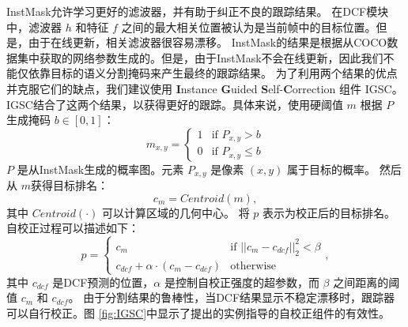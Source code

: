 InstMask允许学习更好的滤波器，并有助于纠正不良的跟踪结果。
在DCF模块中，滤波器 $h$ 和特征 $f$ 之间的最大相关位置被认为是当前帧中的目标位置。但是，由于在线更新，相关滤波器很容易漂移。
InstMask的结果是根据从COCO数据集中获取的网络参数生成的。但是，由于InstMask不会在线更新，因此我们不能仅依靠目标的语义分割掩码来产生最终的跟踪结果。
为了利用两个结果的优点并克服它们的缺点，我们建议使用 \textbf{I}nstance \textbf{G}uided \textbf{S}elf-\textbf{C}orrection 组件 IGSC。IGSC结合了这两个结果，以获得更好的跟踪。具体来说，使用硬阈值 $m$ 根据 $P$ 生成掩码 $b \in [0, 1] $：
\begin{equation}
m_{x,y} = \left\{ \begin{array}{ll}
 1 & \textrm{if $P_{x,y} > b$}\\
 0 & \textrm{if $P_{x,y} \le b$}
 \end{array} \right.
\end{equation}
$P$ 是从InstMask生成的概率图。元素 $P_{x,y}$ 是像素 $(x,y)$ 属于目标的概率。
然后从 $m$获得目标排名：
\begin{equation}
c_{m} = Centroid(m),
\end{equation}
其中 $Centroid(\mathord{\cdot})$ 可以计算区域的几何中心。
将 $p$ 表示为校正后的目标排名。
自校正过程可以描述如下：
\begin{equation}
p = \left\{ \begin{array}{ll}
 c_{m} & \textrm{if $||c_{m}-c_{dcf}||_2^2 < \beta$}\\
 c_{dcf} + \alpha \cdot (c_{m}-c_{dcf}) & \textrm{otherwise}
 \end{array} \right.,
\end{equation}
其中 $c_{dcf}$ 是DCF预测的位置，$\alpha$ 是控制自校正强度的超参数，而 $\beta$ 之间距离的阈值 $c_{m}$ 和 $c_{dcf}$。
由于分割结果的鲁棒性，当DCF结果显示不稳定漂移时，跟踪器可以自行校正。图 \ref{fig:IGSC}中显示了提出的实例指导的自校正组件的有效性。

